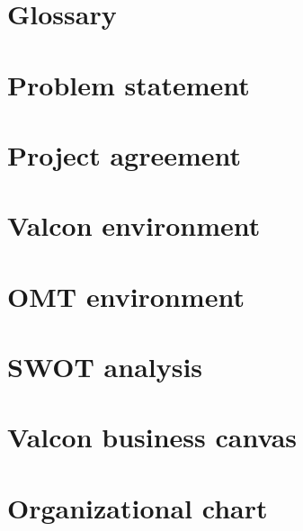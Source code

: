 \chapter{Glossary}

\chapter{Problem statement}

\chapter{Project agreement}

\chapter{Valcon environment}

\chapter{OMT environment}

\chapter{SWOT analysis}

\chapter{Valcon business canvas}


\label{app:it_strategy}

\chapter{Organizational chart}

